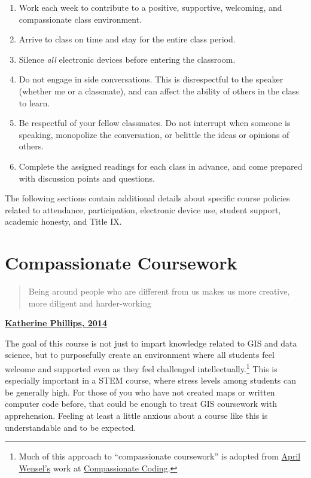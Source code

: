 \documentclass[]{book}
\providecommand{\tightlist}{%
  \setlength{\itemsep}{0pt}\setlength{\parskip}{0pt}}
\let\rmarkdownfootnote\footnote%
\def\footnote{\protect\rmarkdownfootnote}
\begin{document}
\begin{enumerate}
\def\labelenumi{\arabic{enumi}.}
\tightlist
\item
  Work each week to contribute to a positive, supportive, welcoming, and compassionate class environment.
\item
  Arrive to class on time and stay for the entire class period.
\item
  Silence \emph{all} electronic devices before entering the classroom.
\item
  Do not engage in side conversations. This is disrespectful to the speaker (whether me or a classmate), and can affect the ability of others in the class to learn.
\item
  Be respectful of your fellow classmates. Do not interrupt when someone is speaking, monopolize the conversation, or belittle the ideas or opinions of others.
\item
  Complete the assigned readings for each class in advance, and come prepared with discussion points and questions.
\end{enumerate}

The following sections contain additional details about specific course policies related to attendance, participation, electronic device use, student support, academic honesty, and Title IX.

\hypertarget{compassionate-coursework}{%
\section{Compassionate Coursework}\label{compassionate-coursework}}

\begin{quote}
Being around people who are different from us makes us more creative, more diligent and harder-working
\end{quote}

\textbf{\href{https://www.scientificamerican.com/article/how-diversity-makes-us-smarter/}{Katherine Phillips, 2014}}

The goal of this course is not just to impart knowledge related to GIS and data science, but to purposefully create an environment where all students feel welcome and supported even as they feel challenged intellectually.\footnote{Much of this approach to ``compassionate coursework'' is adopted from \href{https://twitter.com/aprilwensel}{April Wensel's} work at \href{https://compassionatecoding.com}{Compassionate Coding}.} This is especially important in a STEM course, where stress levels among students can be generally high. For those of you who have not created maps or written computer code before, that could be enough to treat GIS coursework with apprehension. Feeling at least a little anxious about a course like this is understandable and to be expected.
\end{document}
